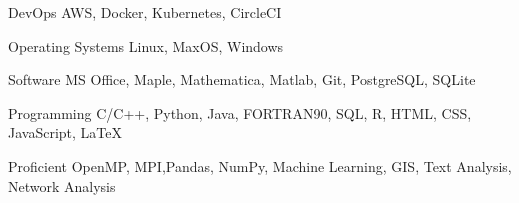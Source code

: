 

\begin{cvskills}

  \cvskill
    {DevOps} %
    {AWS, Docker, Kubernetes, CircleCI} %

  \cvskill
    {Operating Systems} %
    {Linux, MaxOS, Windows} %

  \cvskill
    {Software} %
    {MS Office, Maple, Mathematica, Matlab, Git, PostgreSQL, SQLite} %

  \cvskill
    {Programming} %
    {C/C++, Python, Java, FORTRAN90, SQL, R, HTML, CSS, JavaScript, \LaTeX} %

  \cvskill
    {Proficient} %
    {OpenMP, MPI,Pandas, NumPy, Machine Learning, GIS, Text Analysis, Network Analysis} %

\end{cvskills}
